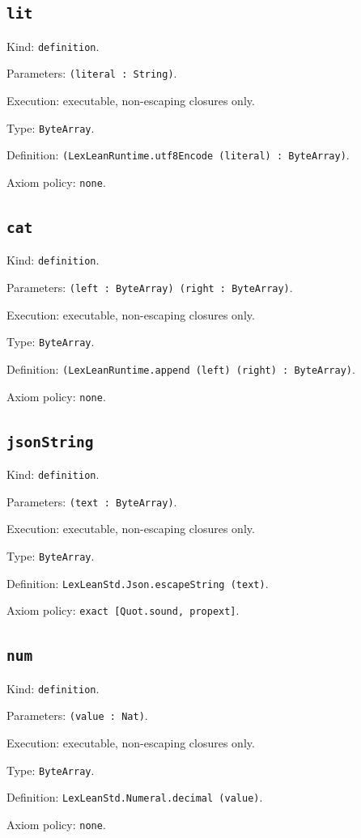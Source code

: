 \documentclass[11pt]{article}
\begin{document}
\subsection*{\texttt{lit}}
\noindent Kind: \texttt{definition}.\par
\noindent Parameters: \texttt{(literal : String)}.\par
\noindent Execution: executable, non-escaping closures only.\par
\noindent Type: \texttt{ByteArray}.\par
\noindent Definition: \texttt{(LexLeanRuntime.utf8Encode (literal) : ByteArray)}.\par
\noindent Axiom policy: \texttt{none}.\par
\subsection*{\texttt{cat}}
\noindent Kind: \texttt{definition}.\par
\noindent Parameters: \texttt{(left : ByteArray) (right : ByteArray)}.\par
\noindent Execution: executable, non-escaping closures only.\par
\noindent Type: \texttt{ByteArray}.\par
\noindent Definition: \texttt{(LexLeanRuntime.append (left) (right) : ByteArray)}.\par
\noindent Axiom policy: \texttt{none}.\par
\subsection*{\texttt{jsonString}}
\noindent Kind: \texttt{definition}.\par
\noindent Parameters: \texttt{(text : ByteArray)}.\par
\noindent Execution: executable, non-escaping closures only.\par
\noindent Type: \texttt{ByteArray}.\par
\noindent Definition: \texttt{LexLeanStd.Json.escapeString (text)}.\par
\noindent Axiom policy: \texttt{exact [Quot.sound, propext]}.\par
\subsection*{\texttt{num}}
\noindent Kind: \texttt{definition}.\par
\noindent Parameters: \texttt{(value : Nat)}.\par
\noindent Execution: executable, non-escaping closures only.\par
\noindent Type: \texttt{ByteArray}.\par
\noindent Definition: \texttt{LexLeanStd.Numeral.decimal (value)}.\par
\noindent Axiom policy: \texttt{none}.\par
\end{document}
